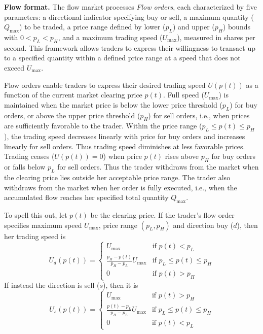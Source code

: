 \documentclass[12pt]{article}
\begin{document}
\bigskip
\noindent
\textbf{Flow format.}
The flow market processes  \textit{Flow orders}, %
each characterized by five parameters: a directional indicator specifying buy or sell, a maximum quantity (\(Q_{\max}\)) to be traded, a price range defined by lower (\(p_L\)) and upper (\(p_H\)) bounds with \(0<p_L < p_H\), and a maximum trading speed (\(U_{\max}\)), measured in shares per second. This framework allows traders to express their willingness to transact up to a specified quantity within a defined price range at a speed that does not exceed \(U_{\max}\).

Flow orders enable traders to express their desired trading speed \(U(p(t))\)  as a function of the current market clearing price \(p(t)\). 
Full speed (\(U_{\max}\)) is maintained when the market price is below the lower price threshold (\(p_L\)) for buy orders, or above the upper price threshold (\(p_H\)) for sell orders, i.e., when prices are sufficiently favorable to the trader.
Within the price range (\(p_L \leq p(t) \leq p_H\)), the trading speed decreases linearly with price for buy orders and increases linearly for sell orders. Thus trading speed diminishes at less favorable prices. 
Trading ceases (\(U(p(t)) = 0\)) when price $p(t)$ rises above \(p_H\) for buy orders or falls below \(p_L\) for sell orders. Thus the trader withdraws from the market when the clearing price lies outside her acceptable price range. 
The trader also withdraws from the market when her order is fully executed, i.e., when the accumulated flow reaches her specified total quantity \(Q_{\max}\).

To spell this out, let $p(t)$ be the clearing price. If the trader's flow order specifies maximum speed $U_{\max}$, price range $(p_L , p_H)$ and direction buy ($d$), then her trading speed is
\begin{equation}\label{eq:flowd}
U_{d}(p(t)) = \begin{cases}
U_{\max} & \text{if } p(t) < p_L \\
\frac{p_H - p(t)}{p_H - p_L} U_{\max} & \text{if } p_L \leq p(t) \leq p_H \\
0 & \text{if } p(t) > p_H
\end{cases}
\end{equation}
If instead the direction is sell ($s$),
then it is
\begin{equation}\label{eq:flows}
U_s(p(t)) = \begin{cases}
	U_{\max} & \text{if } p(t) > p_H\\
	\frac{p(t) - p_L}{p_H - p_L} U_{\max} & \text{if } p_L \leq p(t) \leq p_H \\
	0 & \text{if } p(t) < p_L 
\end{cases}
\end{equation}
\end{document}

